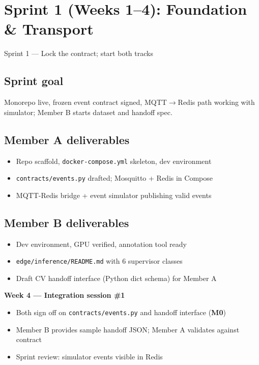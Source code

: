\documentclass[12pt,a4paper]{article}
\begin{document}
\section{Sprint 1 (Weeks 1--4): Foundation \& Transport}

\begin{sprintbox}{Sprint 1 --- Lock the contract; start both tracks}

\subsection*{Sprint goal}
Monorepo live, frozen event contract signed, MQTT$\rightarrow$Redis path working with simulator; Member B starts dataset and handoff spec.

\subsection*{Member A deliverables}
\begin{itemize}
    \item Repo scaffold, \texttt{docker-compose.yml} skeleton, dev environment
    \item \texttt{contracts/events.py} drafted; Mosquitto + Redis in Compose
    \item MQTT-Redis bridge + event simulator publishing valid events
\end{itemize}

\subsection*{Member B deliverables}
\begin{itemize}
    \item Dev environment, GPU verified, annotation tool ready
    \item \texttt{edge/inference/README.md} with 6 supervisor classes
    \item Draft CV handoff interface (Python dict schema) for Member A
\end{itemize}

\begin{collabbox}
\textbf{Week 4 --- Integration session \#1}
\begin{itemize}
    \item Both sign off on \texttt{contracts/events.py} and handoff interface (\textbf{M0})
    \item Member B provides sample handoff JSON; Member A validates against contract
    \item Sprint review: simulator events visible in Redis
\end{itemize}
\end{collabbox}

\end{sprintbox}
\end{document}
